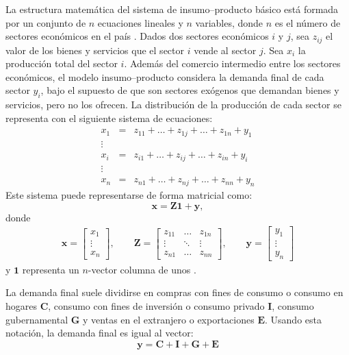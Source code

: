 La estructura matemática del sistema de insumo--producto básico está formada por un conjunto de $n$ ecuaciones lineales y $n$ variables, donde $n$ es el número de sectores económicos en el país \parencite[p.~10]{Miller2012}. Dados dos sectores económicos $i$ y $j$, sea $z_{ij}$ el valor de los bienes y servicios que el sector $i$ vende al sector $j$. Sea $x_i$ la producción total del sector $i$. Además del comercio intermedio entre los sectores económicos, el modelo insumo--producto considera la demanda final de cada sector $y_i$, bajo el supuesto de que son sectores exógenos que demandan bienes y servicios, pero no los ofrecen. La distribución de la producción de cada sector se representa con el siguiente sistema de ecuaciones:
\begin{eqnarray}
 x_1 &=& z_{11} + \ldots + z_{1j} + \ldots + z_{1n} + y_1\\
 \vdots & & \\
 x_i &=& z_{i1} + \ldots + z_{ij} + \ldots + z_{in} + y_i\\
 \vdots & & \\
 x_n &=& z_{n1} + \ldots + z_{nj} + \ldots + z_{nn} + y_n
\end{eqnarray}
Este sistema puede representarse de forma matricial como:
\begin{equation}
 \textbf{x} = \textbf{Z} \textbf{1} +  \textbf{y},
\end{equation}
donde 
\begin{eqnarray}
 \textbf{x} = \left[\begin{matrix} x_1\\ \vdots\\ x_n \end{matrix} \right],
 \qquad
 \textbf{Z}=\left[\begin{matrix}
  z_{11} & \ldots & z_{1n}\\
  \vdots & \ddots & \vdots\\
  z_{n1} & \ldots & z_{nn}
 \end{matrix} \right],
 \qquad
 \textbf{y} = \left[\begin{matrix}
  y_1\\ \vdots\\ y_n
 \end{matrix} \right]
\end{eqnarray}
y $\textbf{1}$ representa un $n$-vector columna de unos \parencite[pp.~11--12]{Miller2012}.

La demanda final suele dividirse en compras con fines de consumo o consumo en hogares $\textbf{C}$, consumo con fines de inversión o consumo privado $\textbf{I}$, consumo gubernamental $\textbf{G}$ y ventas en el extranjero o exportaciones $\textbf{E}$. Usando esta notación, la demanda final es igual al vector:
\begin{equation}
 \textbf{y} = \textbf{C}+\textbf{I}+\textbf{G}+\textbf{E}
\end{equation}

